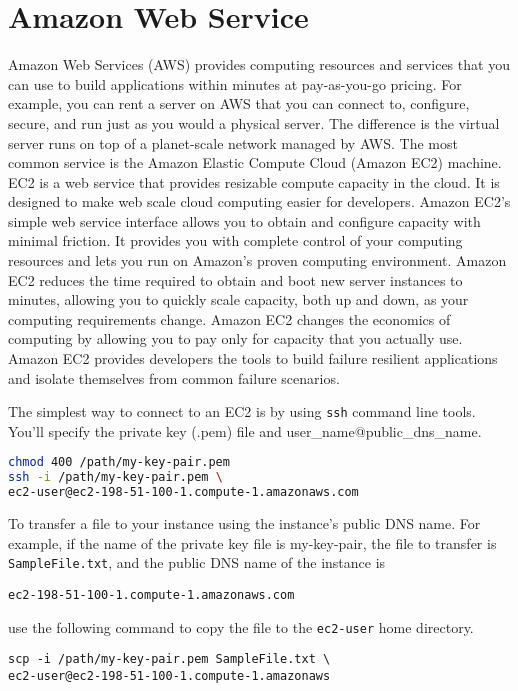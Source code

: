 \section{Amazon Web Service}

Amazon Web Services (AWS) provides computing resources and services that you can use to build applications within minutes at pay-as-you-go pricing. For example, you can rent a server on AWS that you can connect to, configure, secure, and run just as you would a physical server. The difference is the virtual server runs on top of a planet-scale network managed by AWS. The most common service is the Amazon Elastic Compute Cloud (Amazon EC2) machine. EC2 is a web service that provides resizable compute capacity in the cloud. It is designed to make web scale cloud computing easier for developers. Amazon EC2’s simple web service interface allows you to obtain and configure capacity with minimal friction. It provides you with complete control of your computing resources and lets you run on Amazon’s proven computing environment. Amazon EC2 reduces the time required to obtain and boot new server instances to minutes, allowing you to quickly scale capacity, both up and down, as your computing requirements change. Amazon EC2 changes the economics of computing by allowing you to pay only for capacity that you actually use. Amazon EC2 provides developers the tools to build failure resilient applications and isolate themselves from common failure scenarios.

The simplest way to connect to an EC2 is by using \texttt{ssh} command line tools. You'll specify the private key (.pem) file and user\_name@public\_dns\_name. 
\begin{lstlisting}[language=bash]
chmod 400 /path/my-key-pair.pem
ssh -i /path/my-key-pair.pem \
ec2-user@ec2-198-51-100-1.compute-1.amazonaws.com
\end{lstlisting}

To transfer a file to your instance using the instance's public DNS name. For example, if the name of the private key file is my-key-pair, the file to transfer is	\texttt{SampleFile.txt}, and the public DNS name of the instance is \begin{lstlisting}
ec2-198-51-100-1.compute-1.amazonaws.com
\end{lstlisting} use the following command to copy the file to the \texttt{ec2-user} home directory.
\begin{lstlisting}
scp -i /path/my-key-pair.pem SampleFile.txt \
ec2-user@ec2-198-51-100-1.compute-1.amazonaws
\end{lstlisting}
